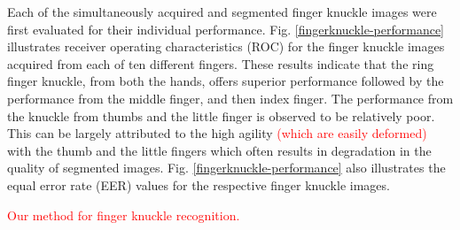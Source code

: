 Each of the simultaneously acquired and segmented finger knuckle images were first evaluated for their individual performance. Fig. \ref{fingerknuckle-performance} illustrates receiver operating characteristics (ROC) for the finger knuckle images acquired from each of ten different fingers. These results indicate that the ring finger knuckle, from both the hands, offers superior performance followed by the performance from the middle finger, and then index finger. The performance from the knuckle from thumbs and the little finger is observed to be relatively poor. This can be largely attributed to the high agility \textcolor{red}{(which are easily deformed)} with the thumb and the little fingers which often results in degradation in the quality of segmented images. Fig. \ref{fingerknuckle-performance} also illustrates the equal error rate (EER) values for the respective finger knuckle images. 

\textcolor{red}{Our method for finger knuckle recognition.}

